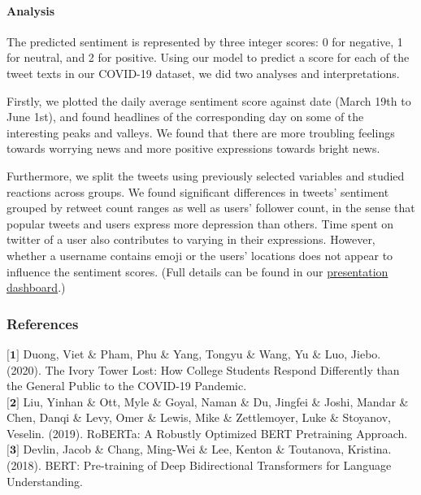 \documentclass{article}
\begin{document}
\paragraph{Analysis}  The predicted sentiment is represented by three integer scores: 0 for negative, 1 for neutral, and 2 for positive. Using our model to predict a score for each of the tweet texts in our COVID-19 dataset, we did two analyses and interpretations.

Firstly, we plotted the daily average sentiment score against date (March 19th to June 1st), and found headlines of the corresponding day on some of the interesting peaks and valleys. We found that there are more troubling feelings towards worrying news and more positive expressions towards bright news.

Furthermore, we split the tweets using previously selected variables and studied reactions across groups. We found significant differences in tweets' sentiment grouped by retweet count ranges as well as users' follower count, in the sense that popular tweets and users express more depression than others. Time spent on twitter of a user also contributes to varying in their expressions. However, whether a username contains emoji or the users' locations does not appear to influence the sentiment scores. (Full details can be found in our \href{https://tingfengx.github.io/Team-ZeroLoss/}{presentation dashboard}.)
\subsubsection*{References}
$\textbf{[1]}$ Duong, Viet \& Pham, Phu \& Yang, Tongyu \& Wang, Yu \& Luo, Jiebo. (2020). The Ivory Tower Lost: How College Students Respond Differently than the General Public to the COVID-19 Pandemic.\\
$\textbf{[2]}$ Liu, Yinhan \& Ott, Myle \& Goyal, Naman \& Du, Jingfei \& Joshi, Mandar \& Chen, Danqi \& Levy, Omer \& Lewis, Mike \& Zettlemoyer, Luke \& Stoyanov, Veselin. (2019). RoBERTa: A Robustly Optimized BERT Pretraining Approach. \\
$\textbf{[3]}$ Devlin, Jacob \& Chang, Ming-Wei \& Lee, Kenton \& Toutanova, Kristina. (2018). BERT: Pre-training of Deep Bidirectional Transformers for Language Understanding.
\end{document}
